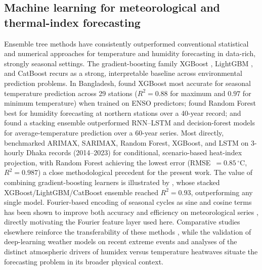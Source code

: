 \documentclass[review,11pt]{elsarticle}
\newcommand{\degC}{\ensuremath{^{\circ}\mathrm{C}}}
\begin{document}
\subsection{Machine learning for meteorological and thermal-index forecasting}
Ensemble tree methods have consistently outperformed conventional statistical and
numerical approaches for temperature and humidity forecasting in data-rich,
strongly seasonal settings. The gradient-boosting family XGBoost
\citep{chen2016xgboost}, LightGBM \citep{ke2017lightgbm}, and CatBoost
\citep{prokhorenkova2018catboost} recurs as a strong, interpretable baseline
across environmental prediction problems. In Bangladesh, \citet{islam2026enso}
found XGBoost most accurate for seasonal temperature prediction across 29 stations
($R^{2}=0.88$ for maximum and $0.97$ for minimum temperature) when trained on ENSO
predictors; \citet{akter2025} found Random Forest best for humidity forecasting at
northern stations over a 40-year record; and \citet{rahman2024rnlstm} found a
stacking ensemble outperformed RNN--LSTM and decision-forest models for
average-temperature prediction over a 60-year series. Most directly,
\citet{mollah2026mlheatindex} benchmarked ARIMAX, SARIMAX, Random Forest, XGBoost,
and LSTM on 3-hourly Dhaka records (2014--2023) for conditional, scenario-based
heat-index projection, with Random Forest achieving the lowest error
(RMSE~$=0.85\,\degC$, $R^{2}=0.987$) a close methodological precedent for the
present work. The value of combining gradient-boosting learners is illustrated by
\citet{kim2023toxins}, whose stacked XGBoost/LightGBM/CatBoost ensemble reached
$R^{2}=0.93$, outperforming any single model. Fourier-based encoding of seasonal
cycles as sine and cosine terms has been shown to improve both accuracy and
efficiency on meteorological series \citep{galansales2024}, directly motivating the
Fourier feature layer used here. Comparative studies elsewhere reinforce the
transferability of these methods \citep{hanoon2021ml,abdelsattar2025ml}, while the
validation of deep-learning weather models on recent extreme events
\citep{pasche2025validating} and analyses of the distinct atmospheric drivers of
humidex versus temperature heatwaves \citep{jeong2025humidex} situate the
forecasting problem in its broader physical context.
\end{document}

